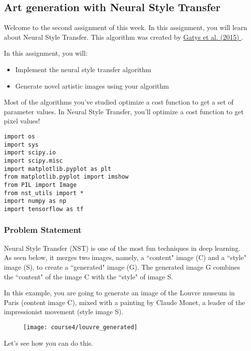 \subsection{Art generation with Neural Style Transfer}

Welcome to the second assignment of this week. In this assignment, you will learn about Neural Style Transfer. This algorithm was created by \href{https://arxiv.org/abs/1508.06576}{Gatys et al. (2015) }.

In this assignment, you will:
\begin{itemize}
\item Implement the neural style transfer algorithm
\item Generate novel artistic images using your algorithm
\end{itemize}

Most of the algorithms you've studied optimize a cost function to get a set of parameter values. In Neural Style Transfer, you'll optimize a cost function to get pixel values!
\begin{verbatim}
import os
import sys
import scipy.io
import scipy.misc
import matplotlib.pyplot as plt
from matplotlib.pyplot import imshow
from PIL import Image
from nst_utils import *
import numpy as np
import tensorflow as tf

\end{verbatim}


\subsubsection{Problem Statement}

Neural Style Transfer (NST) is one of the most fun techniques in deep learning. As seen below, it merges two images, namely, a ``content" image (C) and a ``style" image (S), to create a ``generated" image (G). The generated image G combines the ``content" of the image C with the ``style" of image S.

In this example, you are going to generate an image of the Louvre museum in Paris (content image C), mixed with a painting by Claude Monet, a leader of the impressionist movement (style image S).
\begin{figure}[h]
\begin{center}
\texttt{[image: course4/louvre\_generated]}
\end{center}
\end{figure}

Let's see how you can do this.


